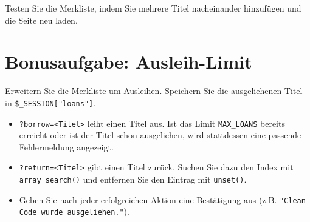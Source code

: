\documentclass[a4paper,12pt]{article}
\begin{document}
Testen Sie die Merkliste, indem Sie mehrere Titel nacheinander hinzufügen und die Seite neu laden.

\section{Bonusaufgabe: Ausleih-Limit}

Erweitern Sie die Merkliste um Ausleihen. Speichern Sie die ausgeliehenen Titel in \texttt{\$\_SESSION["{}loans"{}]}.

\begin{itemize}
    \item \texttt{?borrow=<Titel>} leiht einen Titel aus. Ist das Limit \texttt{MAX\_LOANS} bereits erreicht oder ist der Titel schon ausgeliehen, wird stattdessen eine passende Fehlermeldung angezeigt.
    \item \texttt{?return=<Titel>} gibt einen Titel zurück. Suchen Sie dazu den Index mit \texttt{array\_search()} und entfernen Sie den Eintrag mit \texttt{unset()}.
    \item Geben Sie nach jeder erfolgreichen Aktion eine Bestätigung aus (z.B. \texttt{"{}Clean Code wurde ausgeliehen."{}}).
\end{itemize}
\end{document}

